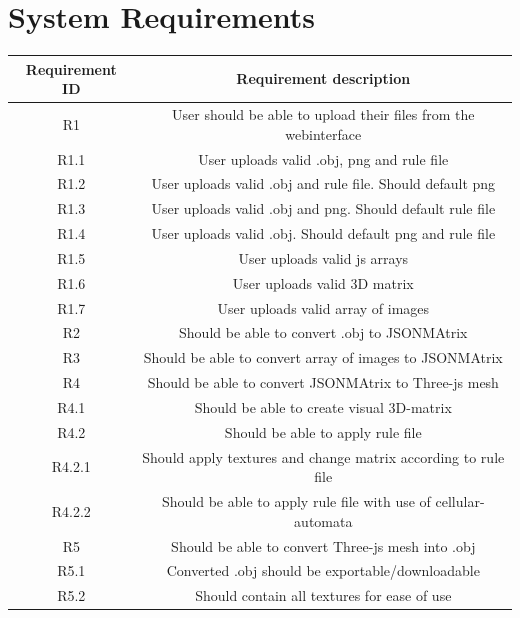 \documentclass[english]{article}
\begin{document}
	\section{System Requirements}
	\begin{tabular}{||c | c||} 
		\hline
		Requirement ID & Requirement description \\ [0.5ex] 
		\hline\hline
		R1 & User should be able to upload their files from the webinterface \\ 
		\hline
		R1.1 & User uploads valid .obj, png and rule file \\ 
		\hline
		R1.2 & User uploads valid .obj and rule file. Should default png \\
		\hline
		R1.3 & User uploads valid .obj and png. Should default rule file \\
		\hline
		R1.4 & User uploads valid .obj. Should default png and rule file \\
		\hline
		R1.5 & User uploads valid js arrays \\
		\hline
		R1.6 & User uploads valid 3D matrix \\
		\hline
		R1.7 & User uploads valid array of images \\
		\hline
		R2 & Should be able to convert .obj to JSONMAtrix \\ 
		\hline
		R3 & Should be able to convert array of images to JSONMAtrix \\ 
		\hline
		R4 & Should be able to convert JSONMAtrix to Three-js mesh \\ 
		\hline
		R4.1 & Should be able to create visual 3D-matrix \\ 
		\hline
		R4.2 & Should be able to apply rule file \\ 
		\hline
		R4.2.1 & Should apply textures and change matrix according to rule file \\ 
		\hline
		R4.2.2 & Should be able to apply rule file with use of cellular-automata\\ 
		\hline
		R5 & Should be able to convert Three-js mesh into .obj\\ 
		\hline
		R5.1 & Converted .obj should be exportable/downloadable\\ 
		\hline
		R5.2 & Should contain all textures for ease of use\\ 
		\hline	
	\end{tabular}
	
		\pagebreak
		
\end{document}
